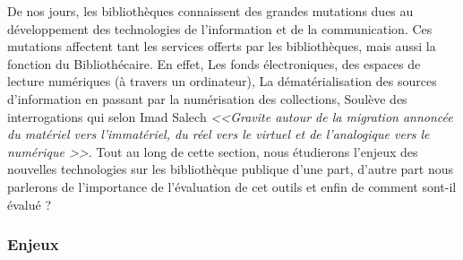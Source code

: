 \documentclass[french,a4paper,12pt]{article}
\begin{document}
\quad De nos jours, les bibliothèques connaissent des grandes mutations dues au développement des technologies de l'information et de la communication. Ces mutations affectent tant les services offerts par les bibliothèques, mais aussi la fonction du Bibliothécaire. En effet, Les fonds électroniques, des espaces de lecture numériques (à travers un ordinateur), La dématérialisation des sources d'information en passant par la numérisation des collections, Soulève des interrogations qui selon Imad Salech \textit{<<Gravite autour de la migration annoncée du matériel vers l'immatériel, du réel vers le virtuel et de l'analogique vers le numérique >>}\citep{saleh_bibliotheques_2009}. Tout au long de cette section, nous étudierons l’enjeux  des nouvelles technologies  sur les bibliothèque publique d’une part, d’autre part nous parlerons de l’importance de l’évaluation de cet outils  et enfin de comment sont-il évalué ?

\subsubsection{Enjeux} 
\end{document}
